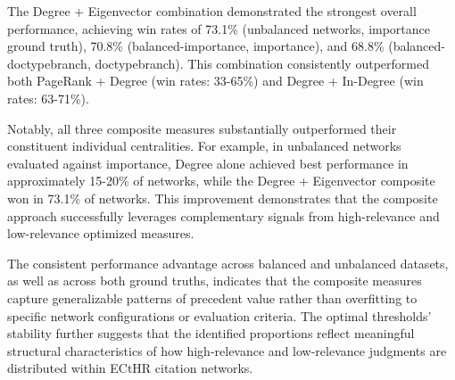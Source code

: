 
The Degree + Eigenvector combination demonstrated the strongest overall performance, achieving win rates of 73.1\% (unbalanced networks, importance ground truth), 70.8\% (balanced-importance, importance), and 68.8\% (balanced-doctypebranch, doctypebranch). This combination consistently outperformed both PageRank + Degree (win rates: 33-65\%) and Degree + In-Degree (win rates: 63-71\%).

Notably, all three composite measures substantially outperformed their constituent individual centralities. For example, in unbalanced networks evaluated against importance, Degree alone achieved best performance in approximately 15-20\% of networks, while the Degree + Eigenvector composite won in 73.1\% of networks. This improvement demonstrates that the composite approach successfully leverages complementary signals from high-relevance and low-relevance optimized measures.

The consistent performance advantage across balanced and unbalanced datasets, as well as across both ground truths, indicates that the composite measures capture generalizable patterns of precedent value rather than overfitting to specific network configurations or evaluation criteria. The optimal thresholds' stability further suggests that the identified proportions reflect meaningful structural characteristics of how high-relevance and low-relevance judgments are distributed within ECtHR citation networks.
